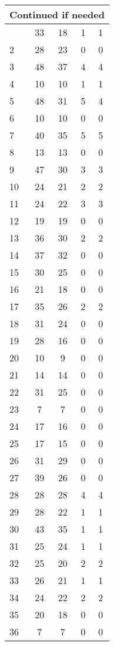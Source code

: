 \begin{center}
\begin{longtable}{l|c|c|c|c}
\hline \multicolumn{5}{|r|}{{Continued if needed}} \\ \hline
\endfoot 
1 & 33 & 18 & 1 & 1\\ \hline
2 & 28 & 23 & 0 & 0\\ \hline
3 & 48 & 37 & 4 & 4\\ \hline
4 & 10 & 10 & 1 & 1\\ \hline
5 & 48 & 31 & 5 & 4\\ \hline
6 & 10 & 10 & 0 & 0\\ \hline
7 & 40 & 35 & 5 & 5\\ \hline
8 & 13 & 13 & 0 & 0\\ \hline
9 & 47 & 30 & 3 & 3\\ \hline
10 & 24 & 21 & 2 & 2\\ \hline
11 & 24 & 22 & 3 & 3\\ \hline
12 & 19 & 19 & 0 & 0\\ \hline
13 & 36 & 30 & 2 & 2\\ \hline
14 & 37 & 32 & 0 & 0\\ \hline
15 & 30 & 25 & 0 & 0\\ \hline
16 & 21 & 18 & 0 & 0\\ \hline
17 & 35 & 26 & 2 & 2\\ \hline
18 & 31 & 24 & 0 & 0\\ \hline
19 & 28 & 16 & 0 & 0\\ \hline
20 & 10 & 9 & 0 & 0\\ \hline
21 & 14 & 14 & 0 & 0\\ \hline
22 & 31 & 25 & 0 & 0\\ \hline
23 & 7 & 7 & 0 & 0\\ \hline
24 & 17 & 16 & 0 & 0\\ \hline
25 & 17 & 15 & 0 & 0\\ \hline
26 & 31 & 29 & 0 & 0\\ \hline
27 & 39 & 26 & 0 & 0\\ \hline
28 & 28 & 28 & 4 & 4\\ \hline
29 & 28 & 22 & 1 & 1\\ \hline
30 & 43 & 35 & 1 & 1\\ \hline
31 & 25 & 24 & 1 & 1\\ \hline
32 & 25 & 20 & 2 & 2\\ \hline
33 & 26 & 21 & 1 & 1\\ \hline
34 & 24 & 22 & 2 & 2\\ \hline
35 & 20 & 18 & 0 & 0\\ \hline
36 & 7 & 7 & 0 & 0\\ \hline

\end{longtable}
\end{center}
